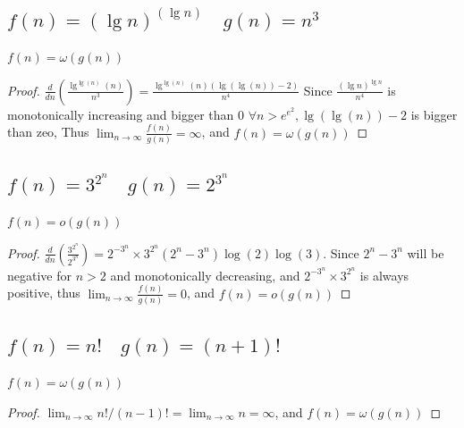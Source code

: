 \documentclass[a4paper]{article}
\begin{document}
\subsection{$f(n)=(\lg n)^{(\lg n)}  \quad  g(n)=n^3$}
$f(n)=\omega(g(n))$
\begin{proof}
        $\frac{d}{d n}\left(\frac{\lg ^{\lg (n)}(n)}{n^3}\right)=\frac{\lg ^{\lg (n)}(n)(\lg (\lg (n))-2)}{n^4}$ Since $\frac {(\lg n)^{\lg n}}{n^{4}}$ is monotonically increasing and bigger than 0 $\forall n > e^e^2, \lg (\lg (n))-2$ is bigger than zeo, Thus $\lim _{n \rightarrow \infty} \frac{f(n)}{g(n)}=\infty$, and $f(n)=\omega(g(n))$
\end{proof}

\subsection{$f(n)=3^ {2^ n } \quad  g(n)=2^ {3^ n} $}
$f(n)=o(g(n))$
\begin{proof}
$\frac{d}{d n}\left(\frac{3^{2^n}}{2^{3^n}}\right)=2^{-3^n} \times 3^{2^n}\left(2^n-3^n\right) \log (2) \log (3)$. Since $2^n-3^n$ will be negative for $n>2$ and monotonically decreasing, and $2^{-3^n} \times 3^{2^n}$ is always positive, thus $\lim _{n \rightarrow \infty} \frac{f(n)}{g(n)}=0$, and $f(n)=o(g(n))$
\end{proof}

\subsection{$f(n)=n !  \quad  g(n)=(n+1) !$}
$f(n)=\omega(g(n))$
\begin{proof}
  $\lim _{n \rightarrow \infty} n ! /(n-1) !=\lim _{n \rightarrow \infty} n=\infty$, and $f(n)=\omega(g(n))$
\end{proof}
\end{document}
